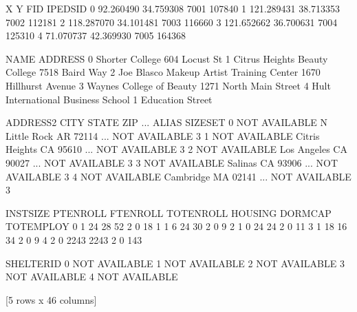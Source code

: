 \documentclass[letterpaper,10pt,english]{jupyterBook}
\begin{document}
\begin{sphinxVerbatim}[commandchars=\\\{\}]
    
\end{sphinxVerbatim}

\begin{sphinxVerbatim}[commandchars=\\\{\}]
            X          Y   FID  IPEDSID  \PYGZbs{}
0  \PYGZhy{}92.260490  34.759308  7001   107840   
1 \PYGZhy{}121.289431  38.713353  7002   112181   
2 \PYGZhy{}118.287070  34.101481  7003   116660   
3 \PYGZhy{}121.652662  36.700631  7004   125310   
4  \PYGZhy{}71.070737  42.369930  7005   164368   

                                       NAME                 ADDRESS  \PYGZbs{}
0                           Shorter College           604 Locust St   
1             Citrus Heights Beauty College          7518 Baird Way   
2  Joe Blasco Makeup Artist Training Center   1670 Hillhurst Avenue   
3                  Waynes College of Beauty  1271 North Main Street   
4        Hult International Business School      1 Education Street   

        ADDRESS2            CITY STATE    ZIP  ...          ALIAS SIZE\PYGZus{}SET  \PYGZbs{}
0  NOT AVAILABLE   N Little Rock    AR  72114  ...  NOT AVAILABLE       \PYGZhy{}3   
1  NOT AVAILABLE  Citris Heights    CA  95610  ...  NOT AVAILABLE       \PYGZhy{}3   
2  NOT AVAILABLE     Los Angeles    CA  90027  ...  NOT AVAILABLE       \PYGZhy{}3   
3  NOT AVAILABLE         Salinas    CA  93906  ...  NOT AVAILABLE       \PYGZhy{}3   
4  NOT AVAILABLE       Cambridge    MA  02141  ...  NOT AVAILABLE       \PYGZhy{}3   

   INST\PYGZus{}SIZE PT\PYGZus{}ENROLL  FT\PYGZus{}ENROLL TOT\PYGZus{}ENROLL  HOUSING DORM\PYGZus{}CAP  TOT\PYGZus{}EMPLOY  \PYGZbs{}
0          1        24         28         52        2        0          18   
1          1         6         24         30        2        0           9   
2          1         0         24         24        2        0          11   
3          1        18         16         34        2        0           9   
4          2         0       2243       2243        2        0         143   

      SHELTER\PYGZus{}ID  
0  NOT AVAILABLE  
1  NOT AVAILABLE  
2  NOT AVAILABLE  
3  NOT AVAILABLE  
4  NOT AVAILABLE  

[5 rows x 46 columns]
\end{sphinxVerbatim}
\end{document}
